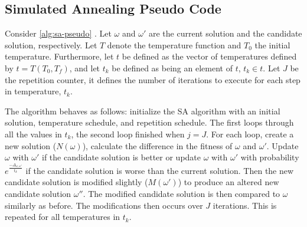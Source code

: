 \documentclass[11pt,a4paper,final]{article}
\newcommand{\Tau}{T}                        %
\begin{document}
\subsection{Simulated Annealing Pseudo Code}
\label{sec:simulated-annealing-pseudo-code}
Consider \ref{alg:sa-pseudo} \cite{henderson-1989-theor-pract}. Let \(\omega\) and \(\omega'\) are the current solution and the
candidate solution, respectively. Let \(\Tau\) denote the temperature function and \(\Tau_0\) the initial temperature.
Furthermore, let \(t\) be defined as the vector of temperatures defined by \(t = \Tau(\Tau_0, \Tau_f)\), and let \(t_k\) be
defined as being an element of \(t\), \(t_k \in t\). Let \(J\) be the repetition counter, it defines the number of iterations to
execute for each step in temperature, \(t_k\).

The algorithm behaves as follows: initialize the SA algorithm with an initial solution, temperature schedule, and
repetition schedule. The first loops through all the values in \(t_k\), the second loop finished when \(j = J\). For each
loop, create a new solution (\(N(\omega)\)), calculate the difference in the fitness of \(\omega\) and \(\omega'\). Update \(\omega\) with \(\omega'\) if
the candidate solution is better or update \(\omega\) with \(\omega'\) with probability \(e^{\frac{-\Delta_{\omega , \omega'}}{t_k}}\) if the candidate
solution is worse than the current solution. Then the new candidate solution is modified slightly (\(M(\omega')\)) to produce
an altered new candidate solution \(\omega{''}\). The modified candidate solution is then compared to \(\omega\) similarly as before.
The modifications then occurs over \(J\) iterations. This is repeated for all temperatures in \(t_k\).
\end{document}
